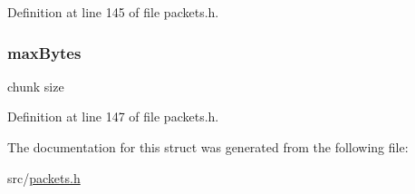 Definition at line 145 of file packets.\+h.

\hypertarget{struct_c_o_n_t_i_n_u_e___u_p_l_o_a_d_a5fc37bdf9450601c27c038ad0ded1304}{}
\subsubsection[{max\+Bytes}]{ max\+Bytes}\label{struct_c_o_n_t_i_n_u_e___u_p_l_o_a_d_a5fc37bdf9450601c27c038ad0ded1304}
chunk size 

Definition at line 147 of file packets.\+h.



The documentation for this struct was generated from the following file\+:\begin{DoxyCompactItemize}
\item 
src/\hyperlink{packets_8h}{packets.\+h}\end{DoxyCompactItemize}
